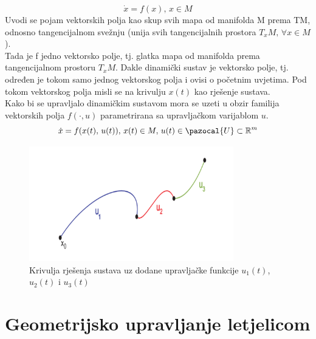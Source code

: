 \documentclass[times, utf8, diplomski]{fer}
\newcommand{\Ua}{\pazocal{U}}
\begin{document}
	\begin{equation}
		\dot{x}=f(x), \, x \in M
	\end{equation}
	Uvodi se pojam vektorskih polja kao skup svih mapa od manifolda M prema TM, odnosno tangencijalnom svežnju (unija svih tangencijalnih prostora $T_xM ,\, \forall x\in M$). \\
	Tada je f jedno vektorsko polje, tj. glatka mapa od manifolda prema tangencijalnom prostoru $T_xM$. Dakle dinamički sustav je vektorsko polje, tj. određen je tokom samo jednog vektorskog polja i ovisi o početnim uvjetima. Pod tokom vektorskog polja misli se na krivulju $x(t)$ kao rješenje sustava. \\
	Kako bi se upravljalo dinamičkim sustavom mora se uzeti u obzir familija vektorskih polja $f(\cdot, u)$ parametrirana sa upravljačkom varijablom $u$. \\
	\begin{equation}
		\dot{x} = f(x(t),\, u(t)), \, x(t)\in M, \, u(t)\in \Ua \subset \mathbb{R}^m
	\end{equation}
	\begin{figure}[h!]
		\includegraphics[width=\textwidth, height=5cm]{figures/krivulja.png}
		\caption{Krivulja rješenja sustava uz dodane upravljačke funkcije $u_1(t)$, $u_2(t)$ i $u_3(t)$}
	\end{figure}
	
	\newpage
	\clearpage
	
\section{Geometrijsko upravljanje letjelicom}
	
\end{document}
